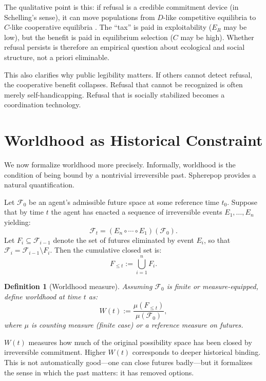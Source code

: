\documentclass[11pt]{article}
\newtheorem{definition}{Definition}
\newcommand{\Future}{\mathcal{F}}
\begin{document}
The qualitative point is this: if refusal is a credible commitment device (in
Schelling's sense), it can move populations from $D$-like competitive equilibria
to $C$-like cooperative equilibria \cite{schelling1960strategy}. The ``tax'' is
paid in exploitability ($E_R$ may be low), but the benefit is paid in
equilibrium selection ($C$ may be high). Whether refusal persists is therefore
an empirical question about ecological and social structure, not a priori
eliminable.

This also clarifies why public legibility matters. If others cannot detect
refusal, the cooperative benefit collapses. Refusal that cannot be recognized
is often merely self-handicapping. Refusal that is socially stabilized becomes
a coordination technology.

\section{Worldhood as Historical Constraint}
\label{sec:worldhood}

We now formalize worldhood more precisely. Informally, worldhood is the
condition of being bound by a nontrivial irreversible past. Spherepop provides
a natural quantification.

Let $\Future_0$ be an agent's admissible future space at some reference time
$t_0$. Suppose that by time $t$ the agent has enacted a sequence of irreversible
events $E_1,\dots,E_n$ yielding:
\[
\Future_t = (E_n \circ \cdots \circ E_1)(\Future_0).
\]
Let $F_i \subseteq \Future_{i-1}$ denote the set of futures eliminated by event
$E_i$, so that $\Future_i = \Future_{i-1} \setminus F_i$. Then the cumulative
closed set is:
\[
F_{\le t} := \bigcup_{i=1}^n F_i.
\]

\begin{definition}[Worldhood measure]
Assuming $\Future_0$ is finite or measure-equipped, define worldhood at time
$t$ as:
\[
W(t) := \frac{\mu(F_{\le t})}{\mu(\Future_0)},
\]
where $\mu$ is counting measure (finite case) or a reference measure on
futures.
\end{definition}

$W(t)$ measures how much of the original possibility space has been closed by
irreversible commitment. Higher $W(t)$ corresponds to deeper historical binding.
This is not automatically good---one can close futures badly---but it formalizes
the sense in which the past matters: it has removed options.
\end{document}
